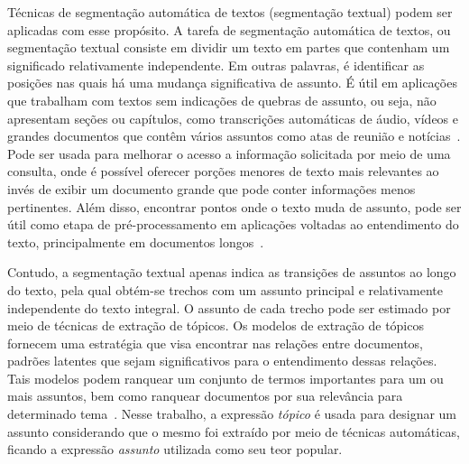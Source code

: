 Técnicas de segmentação automática de textos (segmentação textual) podem ser aplicadas com esse propósito. A tarefa de segmentação automática de textos, ou segmentação textual consiste em dividir um texto em partes que contenham um significado relativamente independente. Em outras palavras, é identificar as posições nas quais há uma mudança significativa de assunto. É útil em aplicações que trabalham com textos sem indicações de quebras de assunto, ou seja, não apresentam seções ou capítulos, como transcrições automáticas de áudio, vídeos e grandes documentos que contêm vários assuntos como atas de reunião e notícias~\cite{ Bokaei2015, Sakahara2014, Misra2009, Eisenstein2008, Choi2000}.
Pode ser usada para melhorar o acesso a informação solicitada por meio de uma consulta, onde é possível oferecer porções menores de texto mais relevantes ao invés de exibir um documento grande que pode conter informações menos pertinentes.  Além disso, encontrar pontos onde o texto muda de assunto, pode ser útil como etapa de pré-processamento em aplicações voltadas ao entendimento do texto, principalmente em documentos longos~\cite{Choi2000}.









Contudo, a segmentação textual apenas indica as transições de assuntos ao longo do texto,  pela qual obtém-se trechos com um assunto principal e relativamente independente do texto integral. O assunto de cada trecho pode ser estimado por meio de técnicas de extração de tópicos.  
Os modelos de extração de tópicos fornecem uma estratégia que visa encontrar nas relações entre documentos, padrões latentes que sejam significativos para o entendimento dessas relações. Tais modelos podem ranquear um conjunto de termos importantes para um ou mais assuntos, bem como ranquear documentos por sua relevância para determinado tema~\cite{Faleiros2016}.
Nesse trabalho, a expressão \textit{tópico} é usada para designar um assunto considerando que o mesmo foi extraído por meio de técnicas automáticas, ficando a expressão \textit{assunto} utilizada como seu teor popular. 

